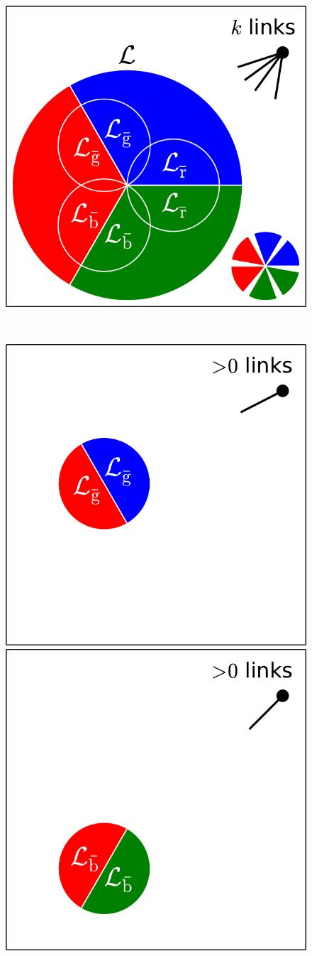 \documentclass[aps, pre, onecolumn, a4paper, floatfix]{revtex4}
\begin{document}
\begin{figure}[htb]
  \begin{minipage}[b]{0.22\linewidth}
    \begin{center}
    \includegraphics[width=0.99\columnwidth]{sets_k_all.pdf}
   \end{center}
  \end{minipage}
  \begin{minipage}[b]{0.1\linewidth}
    \ 
  \end{minipage}
  \begin{minipage}[b]{0.54\linewidth}
    \begin{center}
    \includegraphics[height=0.4\columnwidth]{sets_k_gc_no_2.pdf}
     \hspace{-1mm}
    \includegraphics[trim=100 0 0 0,clip,height=0.4\columnwidth]{sets_k_gc_no_3.pdf}

\end{center}
\end{minipage}
\end{figure}
\end{document}
